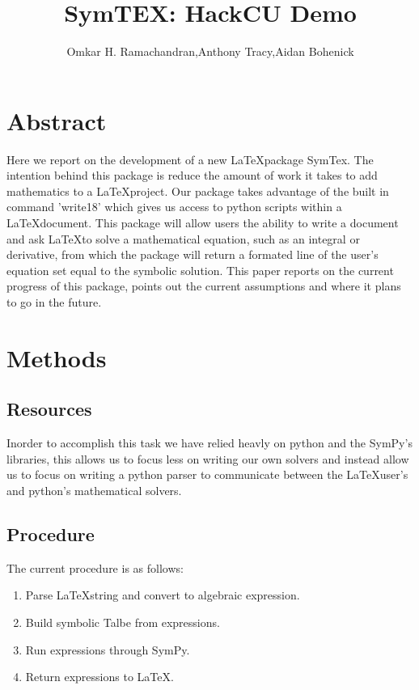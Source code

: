 \documentclass[english]{article}
\begin{document}
\title{SymTEX: HackCU Demo}

\author{Omkar H. Ramachandran,Anthony Tracy,Aidan Bohenick}
\maketitle

\section{Abstract}
Here we report on the development of a new \LaTeX package SymTex. The intention behind this package is reduce the amount of work it takes to add mathematics to a \LaTeX project. Our package takes advantage of the built in command 'write18' which gives us access to python scripts within a \LaTeX document. This package will allow users the ability to write a document and ask \LaTeX to solve a mathematical equation, such as an integral or derivative, from which the package will return a formated line of the user's equation set equal to the symbolic solution. This paper reports on the current progress of this package, points out the current assumptions and where it plans to go in the future.

\section{Methods}

\subsection{Resources}

Inorder to accomplish this task we have relied heavly on python and the SymPy's libraries, this allows us to focus less on writing our own solvers and instead allow us to focus on writing a python parser to communicate between the \LaTeX user's and python's mathematical solvers. 

\subsection{Procedure}

The current procedure is as follows:
\begin{enumerate}
  \item {Parse \LaTeX string and convert to algebraic expression.}
  \item {Build symbolic Talbe from expressions.}
  \item {Run expressions through SymPy.}
  \item {Return expressions to \LaTeX.}
\end{enumerate}
\end{document}
